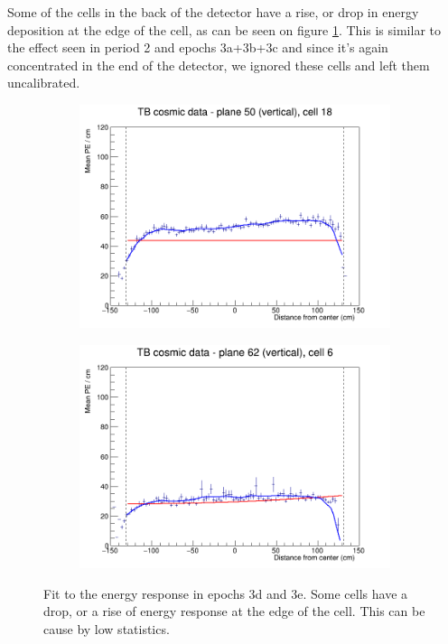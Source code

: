 \documentclass[12pt,a4paper]{article}
\begin{document}
Some of the cells in the back of the detector have a rise, or drop in energy deposition at the edge of the cell, as can be seen on figure \ref{figAttenfitResultsEpoch3de_CellEdges}. This is similar to the effect seen in period 2 and epochs 3a+3b+3c and since it's again concentrated in the end of the detector, we ignored these cells and left them uncalibrated.

\begin{figure}[h]
  \begin{subfigure}{0.5\textwidth}
    \includegraphics[width=\linewidth]{RelativeCalibrationResults/ep3de_050_018.png}
  \end{subfigure}
  \begin{subfigure}{0.5\textwidth}
    \includegraphics[width=\linewidth]{RelativeCalibrationResults/ep3de_062_006.png}
  \end{subfigure}
  \caption{Fit to the energy response in epochs 3d and 3e. Some cells have a drop, or a rise of energy response at the edge of the cell. This can be cause by low statistics.}
  \label{figAttenfitResultsEpoch3de_CellEdges}
\end{figure}
\end{document}
